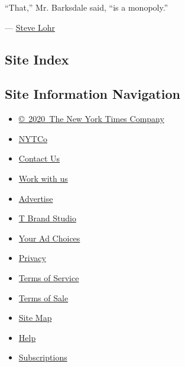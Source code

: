 ``That,'' Mr. Barksdale said, ``is a monopoly.''

--- \href{https://www.nytimes3xbfgragh.onion/by/steve-lohr}{Steve Lohr}

\hypertarget{site-index}{%
\subsection{Site Index}\label{site-index}}

\hypertarget{site-information-navigation}{%
\subsection{Site Information
Navigation}\label{site-information-navigation}}

\begin{itemize}
\tightlist
\item
  \href{https://help.nytimes3xbfgragh.onion/hc/en-us/articles/115014792127-Copyright-notice}{©~2020~The
  New York Times Company}
\end{itemize}

\begin{itemize}
\tightlist
\item
  \href{https://www.nytco.com/}{NYTCo}
\item
  \href{https://help.nytimes3xbfgragh.onion/hc/en-us/articles/115015385887-Contact-Us}{Contact
  Us}
\item
  \href{https://www.nytco.com/careers/}{Work with us}
\item
  \href{https://nytmediakit.com/}{Advertise}
\item
  \href{http://www.tbrandstudio.com/}{T Brand Studio}
\item
  \href{https://www.nytimes3xbfgragh.onion/privacy/cookie-policy\#how-do-i-manage-trackers}{Your
  Ad Choices}
\item
  \href{https://www.nytimes3xbfgragh.onion/privacy}{Privacy}
\item
  \href{https://help.nytimes3xbfgragh.onion/hc/en-us/articles/115014893428-Terms-of-service}{Terms
  of Service}
\item
  \href{https://help.nytimes3xbfgragh.onion/hc/en-us/articles/115014893968-Terms-of-sale}{Terms
  of Sale}
\item
  \href{https://spiderbites.nytimes3xbfgragh.onion}{Site Map}
\item
  \href{https://help.nytimes3xbfgragh.onion/hc/en-us}{Help}
\item
  \href{https://www.nytimes3xbfgragh.onion/subscription?campaignId=37WXW}{Subscriptions}
\end{itemize}
